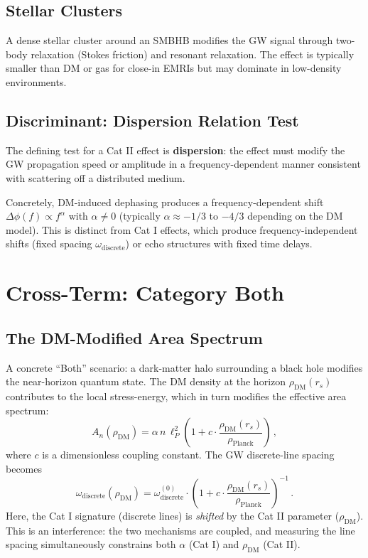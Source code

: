 \documentclass[11pt]{article}
\begin{document}
\subsection{Stellar Clusters}

A dense stellar cluster around an SMBHB modifies the GW signal through two-body relaxation (Stokes friction) and resonant relaxation. The effect is typically smaller than DM or gas for close-in EMRIs but may dominate in low-density environments.

\subsection{Discriminant: Dispersion Relation Test}

The defining test for a Cat II effect is \textbf{dispersion}: the effect must modify the GW propagation speed or amplitude in a frequency-dependent manner consistent with scattering off a distributed medium.

Concretely, DM-induced dephasing produces a frequency-dependent shift $\Delta\phi(f) \propto f^\alpha$ with $\alpha \neq 0$ (typically $\alpha \approx -1/3$ to $-4/3$ depending on the DM model). This is distinct from Cat I effects, which produce frequency-independent shifts (fixed spacing $\omega_{\mathrm{discrete}}$) or echo structures with fixed time delays.

\section{Cross-Term: Category Both}\label{sec:both}

\subsection{The DM-Modified Area Spectrum}

A concrete ``Both'' scenario: a dark-matter halo surrounding a black hole modifies the near-horizon quantum state. The DM density at the horizon $\rho_{\mathrm{DM}}(r_s)$ contributes to the local stress-energy, which in turn modifies the effective area spectrum:
\begin{equation}
A_n(\rho_{\mathrm{DM}}) = \alpha \, n \, \ell_P^2 \left(1 + c \cdot \frac{\rho_{\mathrm{DM}}(r_s)}{\rho_{\mathrm{Planck}}}\right)\,,
\end{equation}
where $c$ is a dimensionless coupling constant. The GW discrete-line spacing becomes
\begin{equation}
\omega_{\mathrm{discrete}}(\rho_{\mathrm{DM}}) = \omega_{\mathrm{discrete}}^{(0)} \cdot \left(1 + c \cdot \frac{\rho_{\mathrm{DM}}(r_s)}{\rho_{\mathrm{Planck}}}\right)^{-1}\,.
\end{equation}
Here, the Cat I signature (discrete lines) is \emph{shifted} by the Cat II parameter ($\rho_{\mathrm{DM}}$). This is an interference: the two mechanisms are coupled, and measuring the line spacing simultaneously constrains both $\alpha$ (Cat I) and $\rho_{\mathrm{DM}}$ (Cat II).
\end{document}
